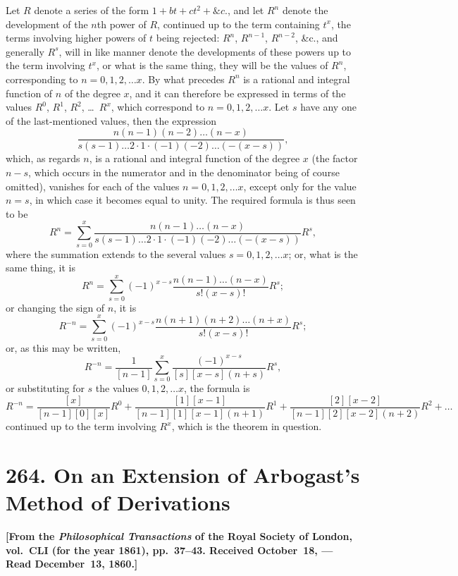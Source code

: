 \documentclass[11pt,a4paper]{book}
\begin{document}
Let $R$ denote a series of the form $1+bt+ct^2+\&c.$, and let $R^n$ denote the development of the $n$th power of $R$, continued up to the term containing $t^x$, the terms involving higher powers of $t$ being rejected: $R^n$, $R^{n-1}$, $R^{n-2}$, \&c., and generally $R^s$, will in like manner denote the developments of these powers up to the term involving $t^x$, or what is the same thing, they will be the values of $R^n$, corresponding to $n=0,1,2,\ldots x$. By what precedes $R^n$ is a rational and integral function of $n$ of the degree $x$, and it can therefore be expressed in terms of the values $R^0$, $R^1$, $R^2$, \ldots\ $R^x$, which correspond to $n=0,1,2,\ldots x$. Let $s$ have any one of the last-mentioned values, then the expression
\[
\frac{n(n-1)(n-2)\ldots(n-x)}{s(s-1)\ldots2\cdot1\cdot(-1)(-2)\ldots(-(x-s))},
\]
which, as regards $n$, is a rational and integral function of the degree $x$ (the factor $n-s$, which occurs in the numerator and in the denominator being of course omitted), vanishes for each of the values $n=0,1,2,\ldots x$, except only for the value $n=s$, in which case it becomes equal to unity. The required formula is thus seen to be
\[
R^n=\sum_{s=0}^{x} \frac{n(n-1)\ldots(n-x)}{s(s-1)\ldots2\cdot1\cdot(-1)(-2)\ldots(-(x-s))}R^s,
\]
where the summation extends to the several values $s=0,1,2,\ldots x$; or, what is the same thing, it is
\[
R^n=\sum_{s=0}^{x} (-1)^{x-s}\frac{n(n-1)\ldots(n-x)}{s!(x-s)!}R^s;
\]
or changing the sign of $n$, it is
\[
R^{-n}=\sum_{s=0}^{x} (-1)^{x-s}\frac{n(n+1)(n+2)\ldots(n+x)}{s!(x-s)!}R^s;
\]
or, as this may be written,
\[
R^{-n}=\frac{1}{[n-1]}\sum_{s=0}^{x}\frac{(-1)^{x-s}}{[s][x-s](n+s)}R^s,
\]
or substituting for $s$ the values $0,1,2,\ldots x$, the formula is
\[
R^{-n}=\frac{[x]}{[n-1][0][x]}R^0+\frac{[1][x-1]}{[n-1][1][x-1](n+1)}R^1+\frac{[2][x-2]}{[n-1][2][x-2](n+2)}R^2+\ldots
\]
continued up to the term involving $R^x$, which is the theorem in question.

\newpage
\section[264. Extension of Arbogast's Method]{264. On an Extension of Arbogast's Method of Derivations}

\textbf{[From the \textit{Philosophical Transactions} of the Royal Society of London, vol.~CLI (for the year 1861), pp.~37--43. Received October~18, --- Read December~13, 1860.]}
\end{document}
